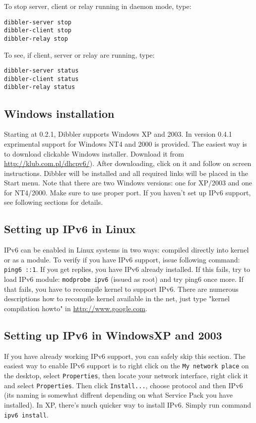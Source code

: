 To stop server, client or relay running in daemon mode, type:
\begin{verbatim}
dibbler-server stop
dibbler-client stop
dibbler-relay stop
\end{verbatim}

To see, if client, server or relay are running, type:

\begin{verbatim}
dibbler-server status
dibbler-client status
dibbler-relay status
\end{verbatim}


\subsection{Windows installation}
Starting at 0.2.1, Dibbler supports Windows XP and 2003. In version
0.4.1 exprimental support for Windows NT4 and 2000 is provided. The easiest
way is to download clickable Windows installer. Download it from
\url{http://klub.com.pl/dhcpv6/}). After downloading, click on it and
follow on screen instructions. Dibbler will be installed and all
required links will be placed in the Start menu. Note that there are
two Windows versions: one for XP/2003 and one for NT4/2000. Make sure
to use proper port. If you haven't set up IPv6 support, see following
sections for details.

\subsection{Setting up IPv6 in Linux}
IPv6 can be enabled in Linux systems in two ways: compiled directly
into kernel or as a module. To verify if you have IPv6 support, issue
following command: \verb+ping6 ::1+. If you get replies, you have IPv6
already installed. If this fails, try to load IPv6 module:
\verb+modprobe ipv6+ (issued as root) and try ping6 once more. If that
fails, you have to recompile kernel to support IPv6. There are 
numerous descriptions how to recompile kernel available in the net, just
type "kernel compilation howto" in \href{Google}{http://www.google.com}.

\subsection{Setting up IPv6 in WindowsXP and 2003}
If you have already working IPv6 support, you can safely skip this section.
The easiest way to enable IPv6 support is to right click on the
\verb+My network place+ on the desktop, select \verb+Properties+, then locate
your network interface, right click it and select \verb+Properties+. Then
click \verb+Install...+, choose protocol and then IPv6 (its naming is
somewhat diffrent depending on what Service Pack you have installed).
In XP, there's much quicker way to install IPv6. Simply run command
\verb+ipv6 install+.

